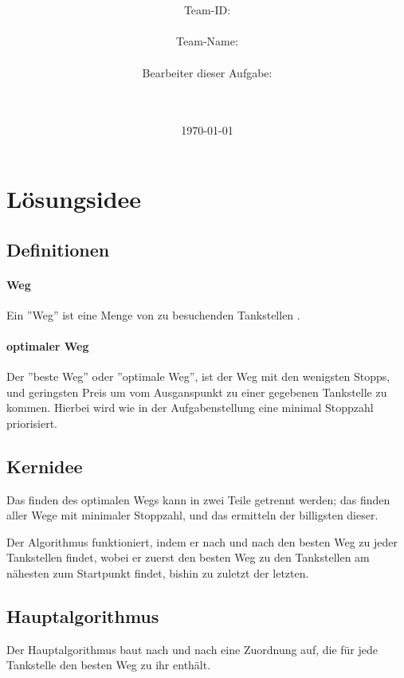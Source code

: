 \documentclass[a4paper,10pt,ngerman]{scrartcl}
\title{\textbf{\Huge\Aufgabe}}
\author{\LARGE Team-ID: \LARGE \TeamID \\\\
	    \LARGE Team-Name: \LARGE \TeamName \\\\
	    \LARGE Bearbeiter dieser Aufgabe: \\ 
	    \LARGE \Namen\\\\}
\date{\LARGE\today}
\begin{document}
\maketitle
\tableofcontents

\vspace{0.5cm}

\section{Lösungsidee}

\subsection{Definitionen}

\paragraph{Weg}

Ein ''Weg'' ist eine Menge von zu besuchenden Tankstellen .

\paragraph{optimaler Weg}

Der ''beste Weg'' oder ''optimale Weg'', ist der Weg mit den wenigsten Stopps, und geringsten Preis um vom Ausganspunkt zu einer gegebenen Tankstelle zu kommen. Hierbei wird wie in der Aufgabenstellung eine minimal Stoppzahl priorisiert.

\subsection{Kernidee}

Das finden des optimalen Wegs kann in zwei Teile getrennt werden; das finden aller Wege mit minimaler Stoppzahl, und das ermitteln der billigsten dieser.

Der Algorithmus funktioniert, indem er nach und nach den besten Weg zu jeder Tankstellen findet, wobei er zuerst den besten Weg zu den Tankstellen am nähesten zum Startpunkt findet, bishin zu zuletzt der letzten.

\subsection{Hauptalgorithmus}

Der Hauptalgorithmus baut nach und nach eine Zuordnung auf, die für jede Tankstelle den besten Weg zu ihr enthält.
\end{document}
